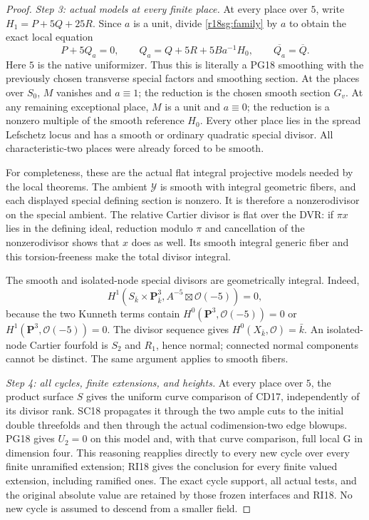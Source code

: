\begin{proof}
\emph{Step 3: actual models at every finite place.}
At every place over \(5\), write
\(H_1=P+5Q+25R\).  Since \(a\) is a unit,
divide \eqref{r18sg:family} by \(a\) to obtain
the exact local equation
\[
 P+5Q_a=0,\qquad
 Q_a=Q+5R+5B a^{-1}H_0,\qquad
                    \overline{Q_a}=\overline Q .
 \tag{SG18.10}\label{r18sg:exact-product}
\]
Here \(5\) is the native uniformizer.
Thus this is literally a PG18 smoothing
with the previously chosen transverse
special factors and smoothing section.
At the places over \(S_0\), \(M\) vanishes
and \(a\equiv1\); the reduction is the
chosen smooth section \(G_v\).
At any remaining exceptional place,
\(M\) is a unit and \(a\equiv0\);
the reduction is a nonzero multiple of
the smooth reference \(H_0\).
Every other place lies in the spread
Lefschetz locus and has a smooth or
ordinary quadratic special divisor.
All characteristic-two places were
already forced to be smooth.

For completeness, these are the actual
flat integral projective models needed
by the local theorems.  The ambient
\(\mathcal Y\) is smooth with integral
geometric fibers, and each displayed
special defining section is nonzero.
It is therefore a nonzerodivisor on
the special ambient.  The relative
Cartier divisor is flat over the DVR:
if \(\pi x\) lies in the defining ideal,
reduction modulo \(\pi\) and cancellation
of the nonzerodivisor shows that \(x\)
does as well.  Its smooth integral
generic fiber and this torsion-freeness
make the total divisor integral.

The smooth and isolated-node special
divisors are geometrically integral.
Indeed,
\[
 H^1(S_{\bar k}\times\mathbf P^3_{\bar k},
                   A^{-5}\boxtimes\mathcal O(-5))=0,
\]
because the two Kunneth terms contain
\(H^0(\mathbf P^3,\mathcal O(-5))=0\)
or \(H^1(\mathbf P^3,\mathcal O(-5))=0\).
The divisor sequence gives
\(H^0(X_{\bar k},\mathcal O)=\bar k\).
An isolated-node Cartier fourfold is
\(S_2\) and \(R_1\), hence normal;
connected normal components cannot
be distinct.  The same argument
applies to smooth fibers.

\emph{Step 4: all cycles, finite extensions, and heights.}
At every place over \(5\), the product
surface \(S\) gives the uniform curve
comparison of CD17, independently
of its divisor rank.  SC18 propagates
it through the two ample cuts to
the initial double threefolds and
then through the actual codimension-two
edge blowups.  PG18 gives \(U_2=0\)
on this model and, with that curve
comparison, full local G in dimension
four.  This reasoning reapplies
directly to every new cycle over
every finite unramified extension;
RI18 gives the conclusion for every
finite valued extension, including
ramified ones.  The exact cycle
support, all actual tests, and the
original absolute value are retained
by those frozen interfaces and RI18.
No new cycle is assumed to descend
from a smaller field.


\end{proof}
